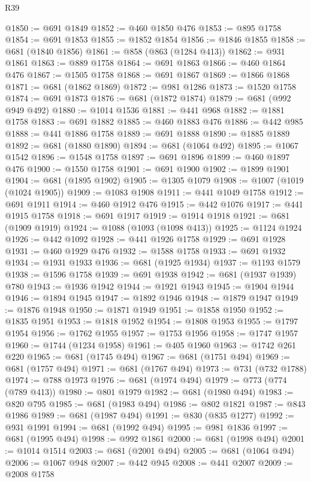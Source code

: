 \begin{lexlean}{R39}
\begin{coremodule}
@1850 := @691 @1849
@1852 := @460 @1850 @476
@1853 := @895 @1758
@1854 := @691 @1853
@1855 := @1852 @1854
@1856 := @1846 @1855
@1858 := @681 (@1840 @1856)
@1861 := @858 (@863 (@1284 @413))
@1862 := @931 @1861
@1863 := @889 @1758
@1864 := @691 @1863
@1866 := @460 @1864 @476
@1867 := @1505 @1758
@1868 := @691 @1867
@1869 := @1866 @1868
@1871 := @681 (@1862 @1869)
@1872 := @981 @1286
@1873 := @1520 @1758
@1874 := @691 @1873
@1876 := @681 (@1872 @1874)
@1879 := @681 (@992 @949 @492)
@1880 := @1014 @1536
@1881 := @441 @968
@1882 := @1881 @1758
@1883 := @691 @1882
@1885 := @460 @1883 @476
@1886 := @442 @985
@1888 := @441 @1886 @1758
@1889 := @691 @1888
@1890 := @1885 @1889
@1892 := @681 (@1880 @1890)
@1894 := @681 (@1064 @492)
@1895 := @1067 @1542
@1896 := @1548 @1758
@1897 := @691 @1896
@1899 := @460 @1897 @476
@1900 := @1550 @1758
@1901 := @691 @1900
@1902 := @1899 @1901
@1904 := @681 (@1895 @1902)
@1905 := @1305 @1079
@1908 := @1007 (@1019 (@1024 @1905))
@1909 := @1083 @1908
@1911 := @441 @1049 @1758
@1912 := @691 @1911
@1914 := @460 @1912 @476
@1915 := @442 @1076
@1917 := @441 @1915 @1758
@1918 := @691 @1917
@1919 := @1914 @1918
@1921 := @681 (@1909 @1919)
@1924 := @1088 (@1093 (@1098 @413))
@1925 := @1124 @1924
@1926 := @442 @1092
@1928 := @441 @1926 @1758
@1929 := @691 @1928
@1931 := @460 @1929 @476
@1932 := @1588 @1758
@1933 := @691 @1932
@1934 := @1931 @1933
@1936 := @681 (@1925 @1934)
@1937 := @1193 @1579
@1938 := @1596 @1758
@1939 := @691 @1938
@1942 := @681 (@1937 @1939) @780
@1943 := @1936 @1942
@1944 := @1921 @1943
@1945 := @1904 @1944
@1946 := @1894 @1945
@1947 := @1892 @1946
@1948 := @1879 @1947
@1949 := @1876 @1948
@1950 := @1871 @1949
@1951 := @1858 @1950
@1952 := @1835 @1951
@1953 := @1818 @1952
@1954 := @1808 @1953
@1955 := @1797 @1954
@1956 := @1762 @1955
@1957 := @1753 @1956
@1958 := @1747 @1957
@1960 := @1744 (@1234 @1958)
@1961 := @405 @1960
@1963 := @1742 @261 @220
@1965 := @681 (@1745 @494)
@1967 := @681 (@1751 @494)
@1969 := @681 (@1757 @494)
@1971 := @681 (@1767 @494)
@1973 := @731 (@732 @1788)
@1974 := @788 @1973
@1976 := @681 (@1974 @494)
@1979 := @773 (@774 (@789 @413))
@1980 := @801 @1979
@1982 := @681 (@1980 @494)
@1983 := @820 @795
@1985 := @681 (@1983 @494)
@1986 := @802 @1821
@1987 := @843 @1986
@1989 := @681 (@1987 @494)
@1991 := @830 (@835 @1277)
@1992 := @931 @1991
@1994 := @681 (@1992 @494)
@1995 := @981 @1836
@1997 := @681 (@1995 @494)
@1998 := @992 @1861
@2000 := @681 (@1998 @494)
@2001 := @1014 @1514
@2003 := @681 (@2001 @494)
@2005 := @681 (@1064 @494)
@2006 := @1067 @948
@2007 := @442 @945
@2008 := @441 @2007
@2009 := @2008 @1758

\end{coremodule}
\end{lexlean}
